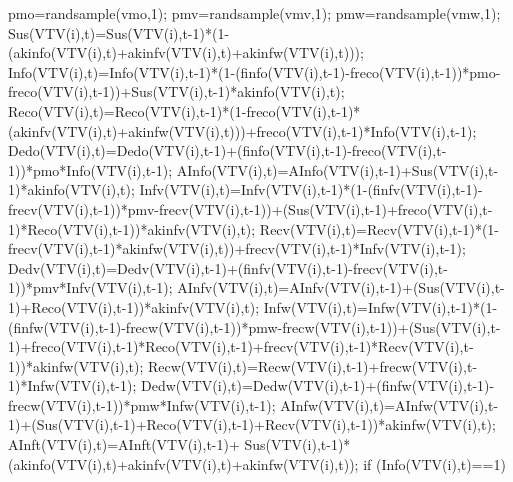                                           pmo=randsample(vmo,1);
                                          pmv=randsample(vmv,1); 
                                          pmw=randsample(vmw,1);                                        
                                          Sus(VTV(i),t)=Sus(VTV(i),t-1)*(1-(akinfo(VTV(i),t)+akinfv(VTV(i),t)+akinfw(VTV(i),t)));
                                          Info(VTV(i),t)=Info(VTV(i),t-1)*(1-(finfo(VTV(i),t-1)-freco(VTV(i),t-1))*pmo-freco(VTV(i),t-1))+Sus(VTV(i),t-1)*akinfo(VTV(i),t);
                                          Reco(VTV(i),t)=Reco(VTV(i),t-1)*(1-freco(VTV(i),t-1)*(akinfv(VTV(i),t)+akinfw(VTV(i),t)))+freco(VTV(i),t-1)*Info(VTV(i),t-1);
                                          Dedo(VTV(i),t)=Dedo(VTV(i),t-1)+(finfo(VTV(i),t-1)-freco(VTV(i),t-1))*pmo*Info(VTV(i),t-1);
                                          AInfo(VTV(i),t)=AInfo(VTV(i),t-1)+Sus(VTV(i),t-1)*akinfo(VTV(i),t);                              
                                          Infv(VTV(i),t)=Infv(VTV(i),t-1)*(1-(finfv(VTV(i),t-1)-frecv(VTV(i),t-1))*pmv-frecv(VTV(i),t-1))+(Sus(VTV(i),t-1)+freco(VTV(i),t-1)*Reco(VTV(i),t-1))*akinfv(VTV(i),t);
                                          Recv(VTV(i),t)=Recv(VTV(i),t-1)*(1-frecv(VTV(i),t-1)*akinfw(VTV(i),t))+frecv(VTV(i),t-1)*Infv(VTV(i),t-1);
                                          Dedv(VTV(i),t)=Dedv(VTV(i),t-1)+(finfv(VTV(i),t-1)-frecv(VTV(i),t-1))*pmv*Infv(VTV(i),t-1);
                                          AInfv(VTV(i),t)=AInfv(VTV(i),t-1)+(Sus(VTV(i),t-1)+Reco(VTV(i),t-1))*akinfv(VTV(i),t);
                                          Infw(VTV(i),t)=Infw(VTV(i),t-1)*(1-(finfw(VTV(i),t-1)-frecw(VTV(i),t-1))*pmw-frecw(VTV(i),t-1))+(Sus(VTV(i),t-1)+freco(VTV(i),t-1)*Reco(VTV(i),t-1)+frecv(VTV(i),t-1)*Recv(VTV(i),t-1))*akinfw(VTV(i),t);
                                          Recw(VTV(i),t)=Recw(VTV(i),t-1)+frecw(VTV(i),t-1)*Infw(VTV(i),t-1);
                                          Dedw(VTV(i),t)=Dedw(VTV(i),t-1)+(finfw(VTV(i),t-1)-frecw(VTV(i),t-1))*pmw*Infw(VTV(i),t-1);
                                          AInfw(VTV(i),t)=AInfw(VTV(i),t-1)+(Sus(VTV(i),t-1)+Reco(VTV(i),t-1)+Recv(VTV(i),t-1))*akinfw(VTV(i),t);                                           
                                          AInft(VTV(i),t)=AInft(VTV(i),t-1)+ Sus(VTV(i),t-1)*(akinfo(VTV(i),t)+akinfv(VTV(i),t)+akinfw(VTV(i),t));
                                          if (Info(VTV(i),t)==1)
                                             
